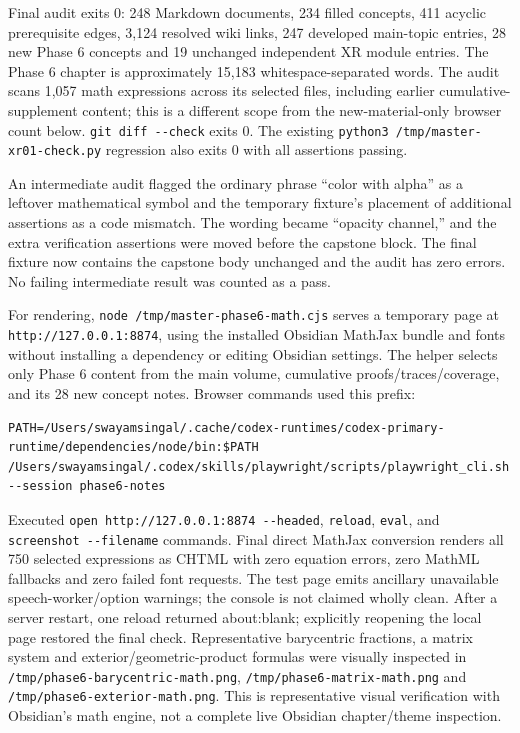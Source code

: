 Final audit exits 0: 248 Markdown documents, 234 filled concepts, 411 acyclic prerequisite edges, 3,124 resolved wiki links, 247 developed main-topic entries, 28 new Phase 6 concepts and 19 unchanged independent XR module entries. The Phase 6 chapter is approximately 15,183 whitespace-separated words. The audit scans 1,057 math expressions across its selected files, including earlier cumulative-supplement content; this is a different scope from the new-material-only browser count below. \texttt{git\ diff\ -\/-check} exits 0. The existing \texttt{python3\ /tmp/master-xr01-check.py} regression also exits 0 with all assertions passing.

An intermediate audit flagged the ordinary phrase ``color with alpha'' as a leftover mathematical symbol and the temporary fixture's placement of additional assertions as a code mismatch. The wording became ``opacity channel,'' and the extra verification assertions were moved before the capstone block. The final fixture now contains the capstone body unchanged and the audit has zero errors. No failing intermediate result was counted as a pass.

For rendering, \texttt{node\ /tmp/master-phase6-math.cjs} serves a temporary page at \texttt{http://127.0.0.1:8874}, using the installed Obsidian MathJax bundle and fonts without installing a dependency or editing Obsidian settings. The helper selects only Phase 6 content from the main volume, cumulative proofs/traces/coverage, and its 28 new concept notes. Browser commands used this prefix:

\begin{verbatim}
PATH=/Users/swayamsingal/.cache/codex-runtimes/codex-primary-runtime/dependencies/node/bin:$PATH /Users/swayamsingal/.codex/skills/playwright/scripts/playwright_cli.sh --session phase6-notes
\end{verbatim}

Executed \texttt{open\ http://127.0.0.1:8874\ -\/-headed}, \texttt{reload}, \texttt{eval}, and \texttt{screenshot\ -\/-filename} commands. Final direct MathJax conversion renders all 750 selected expressions as CHTML with zero equation errors, zero MathML fallbacks and zero failed font requests. The test page emits ancillary unavailable speech-worker/option warnings; the console is not claimed wholly clean. After a server restart, one reload returned about:blank; explicitly reopening the local page restored the final check. Representative barycentric fractions, a matrix system and exterior/geometric-product formulas were visually inspected in \texttt{/tmp/phase6-barycentric-math.png}, \texttt{/tmp/phase6-matrix-math.png} and \texttt{/tmp/phase6-exterior-math.png}. This is representative visual verification with Obsidian's math engine, not a complete live Obsidian chapter/theme inspection.

